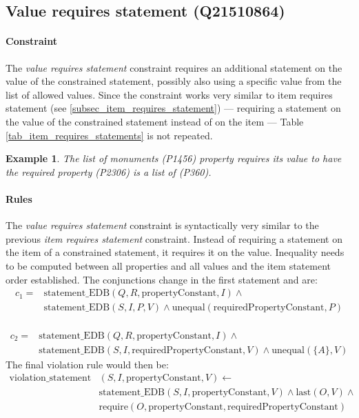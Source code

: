 \documentclass[hyperref,bachelorofscience,fleqn]{cgvpub}
\newtheorem{example}{Example}
\begin{document}
\subsection{Value requires statement (Q21510864)}\label{subsec_value_requires_statement}
\paragraph{Constraint}
The \emph{value requires statement} constraint requires an additional statement on the value of the constrained statement, possibly also using a specific value from the list of allowed values. Since the constraint works very similar to item requires statement (see \ref{subsec_item_requires_statement}) --- requiring a statement on the value of the constrained statement instead of on the item --- Table \ref{tab_item_requires_statements} is not repeated.

\begin{example}
The \emph{list of monuments} (P1456) property requires its value to have the \emph{required property} (P2306) \emph{is a list of} (P360).
\end{example}

\paragraph{Rules}
The \emph{value requires statement} constraint is syntactically very similar to the previous \emph{item requires statement} constraint. Instead of requiring a statement on the item of a constrained statement, it requires it on the value. Inequality needs to be computed between all properties and all values and the item statement order established. The conjunctions change in the first statement and are:
\begin{equation*}
\begin{split}
c_1 = &\text{statement\_EDB}(Q, R, \text{propertyConstant}, I) \wedge{} \\
&\text{statement\_EDB}(S, I, P, V) \wedge \text{unequal}(\text{requiredPropertyConstant}, P)
\end{split}
\end{equation*} \(\)
\begin{equation*}
\begin{split}
c_2 = &\text{statement\_EDB}(Q, R, \text{propertyConstant}, I) \wedge{} \\
&\text{statement\_EDB}(S, I, \text{requiredPropertyConstant}, V) \wedge \text{unequal}(\{A\}, V)
\end{split}
\end{equation*}
The final violation rule would then be:
\begin{equation*}
\begin{split}
\text{violation\_statement}&(S, I, \text{propertyConstant}, V) \leftarrow \\
&\text{statement\_EDB}(S, I, \text{propertyConstant}, V) \wedge{} \text{last}(O, V) \wedge{} \\
&\text{require}(O, \text{propertyConstant}, \text{requiredPropertyConstant})
\end{split}
\end{equation*}
\end{document}
